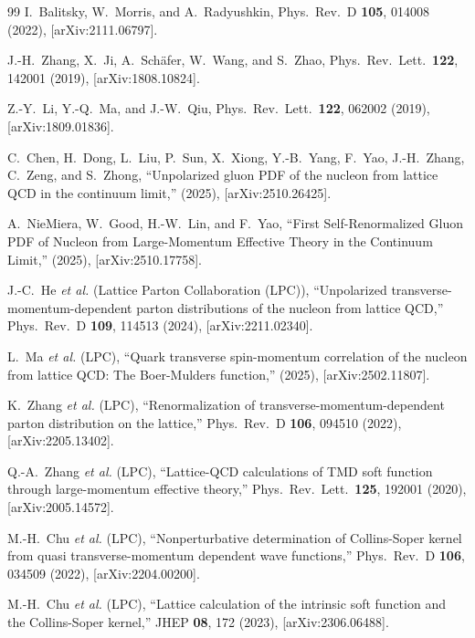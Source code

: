 \documentclass[12pt,a4paper]{ctexart}
\theoremstyle{definition}
\begin{document}
\begin{thebibliography}{99}
I.~Balitsky, W.~Morris, and A.~Radyushkin,
Phys.\ Rev.\ D \textbf{105}, 014008 (2022), [arXiv:2111.06797].

J.-H.~Zhang, X.~Ji, A.~Sch\"afer, W.~Wang, and S.~Zhao,
Phys.\ Rev.\ Lett.\ \textbf{122}, 142001 (2019), [arXiv:1808.10824].

Z.-Y.~Li, Y.-Q.~Ma, and J.-W.~Qiu,
Phys.\ Rev.\ Lett.\ \textbf{122}, 062002 (2019), [arXiv:1809.01836].

C.~Chen, H.~Dong, L.~Liu, P.~Sun, X.~Xiong, Y.-B.~Yang, F.~Yao, J.-H.~Zhang, C.~Zeng, and S.~Zhong,
``Unpolarized gluon PDF of the nucleon from lattice QCD in the continuum limit,''
(2025), [arXiv:2510.26425].

A.~NieMiera, W.~Good, H.-W.~Lin, and F.~Yao,
``First Self-Renormalized Gluon PDF of Nucleon from Large-Momentum Effective Theory in the Continuum Limit,''
(2025), [arXiv:2510.17758].

J.-C.~He \textit{et al.} (Lattice Parton Collaboration (LPC)),
``Unpolarized transverse-momentum-dependent parton distributions of the nucleon from lattice QCD,''
Phys.\ Rev.\ D \textbf{109}, 114513 (2024), [arXiv:2211.02340].

L.~Ma \textit{et al.} (LPC),
``Quark transverse spin-momentum correlation of the nucleon from lattice QCD: The Boer-Mulders function,''
(2025), [arXiv:2502.11807].

K.~Zhang \textit{et al.} (LPC),
``Renormalization of transverse-momentum-dependent parton distribution on the lattice,''
Phys.\ Rev.\ D \textbf{106}, 094510 (2022), [arXiv:2205.13402].

Q.-A.~Zhang \textit{et al.} (LPC),
``Lattice-QCD calculations of TMD soft function through large-momentum effective theory,''
Phys.\ Rev.\ Lett.\ \textbf{125}, 192001 (2020), [arXiv:2005.14572].

M.-H.~Chu \textit{et al.} (LPC),
``Nonperturbative determination of Collins-Soper kernel from quasi transverse-momentum dependent wave functions,''
Phys.\ Rev.\ D \textbf{106}, 034509 (2022), [arXiv:2204.00200].

M.-H.~Chu \textit{et al.} (LPC),
``Lattice calculation of the intrinsic soft function and the Collins-Soper kernel,''
JHEP \textbf{08}, 172 (2023), [arXiv:2306.06488].


\end{thebibliography}
\end{document}
